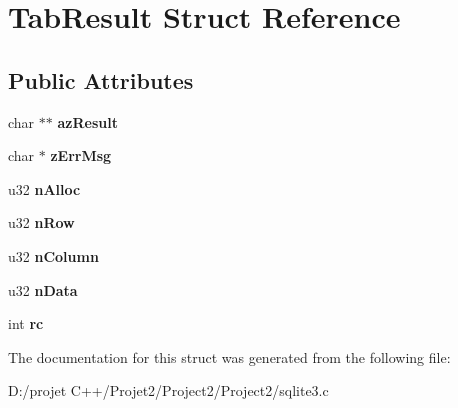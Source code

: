 \hypertarget{struct_tab_result}{}\section{Tab\+Result Struct Reference}
\label{struct_tab_result}
\subsection*{Public Attributes}
\begin{DoxyCompactItemize}
\item 
\mbox{\label{struct_tab_result_a7446a22a7b39c17e447c65ba200490a6}} 
char $\ast$$\ast$ {\bfseries az\+Result}
\item 
\mbox{\label{struct_tab_result_a6e7104bb622be05f16b6470dbb68a6c7}} 
char $\ast$ {\bfseries z\+Err\+Msg}
\item 
\mbox{\label{struct_tab_result_a9d07a6698e6b0293cf26fa3d39d222ea}} 
u32 {\bfseries n\+Alloc}
\item 
\mbox{\label{struct_tab_result_a0c2a87855e7665334ec4f39cc4e2fe8b}} 
u32 {\bfseries n\+Row}
\item 
\mbox{\label{struct_tab_result_a34f54427ffc26de952a3df8fd50a3cca}} 
u32 {\bfseries n\+Column}
\item 
\mbox{\label{struct_tab_result_a15ec3f09bc4ccc6945c2e76bf32cf457}} 
u32 {\bfseries n\+Data}
\item 
\mbox{\label{struct_tab_result_a44bb015ce660ed3f987e324919d73f4d}} 
int {\bfseries rc}
\end{DoxyCompactItemize}


The documentation for this struct was generated from the following file\+:\begin{DoxyCompactItemize}
\item 
D\+:/projet C++/\+Projet2/\+Project2/\+Project2/sqlite3.\+c\end{DoxyCompactItemize}
